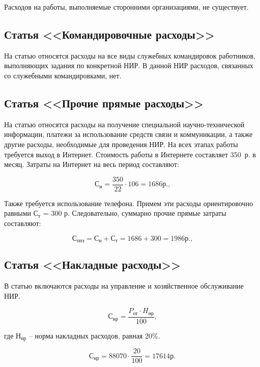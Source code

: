 Расходов на работы, выполняемые сторонними организациями, не существует.

\subsection{Статья <<Командировочные расходы>>}

На статью относятся расходы на все виды служебных командировок работников, выполняющих
задания по конкретной НИР. В данной НИР расходов, связанных со служебными командировками, нет.

\subsection{Статья <<Прочие прямые расходы>>}

На статью относятся расходы на получение специальной научно-технической информации, платежи
за использование средств связи и коммуникации, а также другие расходы, необходимые для проведения НИР.
На всех этапах работы требуется выход в Интернет. Стоимость работы в Интернете составляет 350~р. в месяц.
Затраты на Интернет на весь период составляют:

\begin{equation}
С_{и} = \frac{350}{22} \cdot 106 = 1 686 р.\mbox{,}
\label{F:F5}
\end{equation}

Также требуется использование телефона. Примем эти расходы ориентировочно равными $С_{т}$ = 300 р.
Следовательно, суммарно прочие прямые затраты составляют:

\begin{equation}
С_{ппз} = С_{и} + С_{т} = 1 686 + 300 = 1 986 р.\mbox{,}
\label{F:F6}
\end{equation}

\subsection{Статья <<Накладные расходы>>}

В статью включаются расходы на управление и хозяйственное обслуживание НИР.

\begin{equation}
С_{нр} = \frac{P_{от} \cdot H_{нр}}{100}\mbox{,}
\label{F:F5}
\end{equation}

где $Н_{нр}$ – норма накладных расходов, равная 20\%.

\begin{equation}
С_{нр} = 88 070 \cdot \frac{20}{100} = 17 614 р.
\label{F:F5}
\end{equation}

